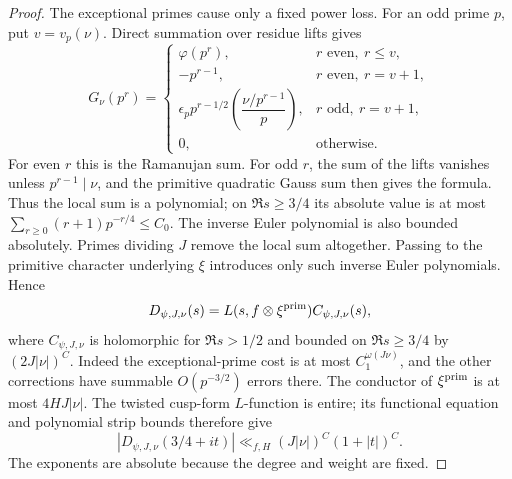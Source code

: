 \begin{proof}
The exceptional primes cause only a fixed power loss.  For an odd prime
$p$, put $v=v_p(\nu)$.  Direct summation over residue lifts gives
\[
 G_\nu(p^r)=
 \begin{cases}
 \varphi(p^r),&r\text{ even},\ r\le v,\\
 -p^{r-1},&r\text{ even},\ r=v+1,\\
 \epsilon_p p^{r-1/2}
       \left(\dfrac{\nu/p^{r-1}}p\right),
          &r\text{ odd},\ r=v+1,\\
 0,&\text{otherwise}.
 \end{cases}
\]
For even $r$ this is the Ramanujan sum.  For odd $r$, the sum of the
lifts vanishes unless $p^{r-1}\mid\nu$, and the primitive quadratic
Gauss sum then gives the formula.  Thus the local sum is a polynomial;
on $\Re s\ge3/4$ its absolute value is at most
$\sum_{r\ge0}(r+1)p^{-r/4}\le C_0$.
The inverse Euler polynomial is also bounded absolutely.  Primes dividing
$J$ remove the local sum altogether.  Passing to the primitive character
underlying $\xi$ introduces only such inverse Euler polynomials.  Hence
\[
 D_{\psi,J,\nu}(s)=L(s,f\otimes\xi^{\rm prim})C_{\psi,J,\nu}(s),
\]
where $C_{\psi,J,\nu}$ is holomorphic for $\Re s>1/2$ and bounded
on $\Re s\ge3/4$ by $(2J|\nu|)^C$.  Indeed the exceptional-prime
cost is at most $C_1^{\omega(J\nu)}$, and the other corrections have
summable $O(p^{-3/2})$ errors there.
The conductor of $\xi^{\rm prim}$ is at most $4HJ|\nu|$.
The twisted cusp-form $L$-function is entire; its functional equation
and polynomial strip bounds therefore give
\begin{equation}\label{odd:gauss-strip}
 |D_{\psi,J,\nu}(3/4+i t)|
 \ll_{f,H}(J|\nu|)^C(1+|t|)^C.
\end{equation}
The exponents are absolute because the degree and weight are fixed.


\end{proof}
